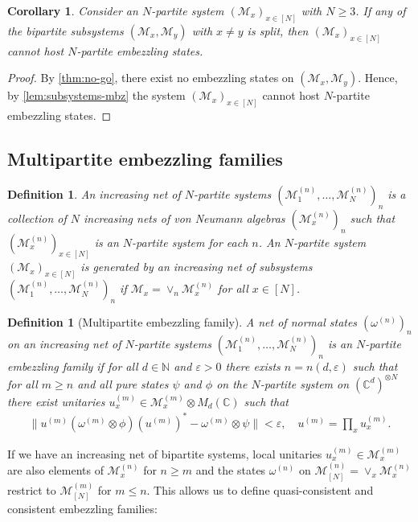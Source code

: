 \documentclass[a4paper, 10pt, onecolumn, accepted=2025-07-22]{quantumarticle}
\newtheorem{corollary}[theorem]{Corollary}
\newtheorem{definition}[theorem]{Definition}
\theoremstyle{definition}
\newcommand{\norm}[1]{\lVert #1\rVert}
\newcommand{\ox}{\otimes}
\newcommand{\mc}{\mathcal}
\newcommand{\eps}{\varepsilon}
\def\CC{{\mathbb C}}
\def\M{{\mc M}}
\def\NN{{\mathbb N}}
\newcommand*{\1}{\text{\usefont{U}{bbold}{m}{n}1}}
\begin{document}
\begin{corollary}\label{cor:nogo} Consider an $N$-partite system $(\M_x)_{x\in[N]}$ with $N\geq 3$. If any of the bipartite subsystems $(\M_x,\M_y)$ with $x\ne y$ is split, then $(\M_x)_{x\in[N]}$ cannot host $N$-partite embezzling states. 
\end{corollary}
\begin{proof}
   By \cref{thm:no-go}, there exist no embezzling states on $(\M_x,\M_y)$. Hence, by \cref{lem:subsystems-mbz} the system $(\M_x)_{x\in[N]}$ cannot host $N$-partite embezzling states.
\end{proof}


\subsection{Multipartite embezzling families}

\begin{definition}\label{def:increasing-net-Npartite}
    An \emph{increasing net of $N$-partite systems} $(\M^{(n)}_1,\ldots,\M^{(n)}_N)_n$ is a collection of $N$ increasing nets of von Neumann algebras $(\M_x^{(n)})_n$ such that $(\M^{(n)}_x)_{x\in[N]}$ is an $N$-partite system for each $n$. 
    An $N$-partite system $(\M_x)_{x\in[N]}$ is \emph{generated} by an increasing net of subsystems $(\M^{(n)}_1,\ldots,\M^{(n)}_N)_n$ if $\M_x = \vee_n \M^{(n)}_x$ for all $x\in[N]$.
\end{definition}


\begin{definition}[Multipartite embezzling family]\label{def:multipartite-mbz-family}
  A net of normal states $(\omega^{(n)})_n$ on an increasing net of $N$-partite systems $(\M_1^{(n)},\ldots,\M_N^{(n)})_n$ is an $N$-\emph{partite embezzling family} if for all $d\in\NN$ and $\eps>0$ there exists $n = n(d,\eps)$ such that for all $m\geq n$ and all pure states $\psi$ and $\phi$ on the $N$-partite system on $(\CC^d)^{\otimes N}$ there exist unitaries $u^{(m)}_x \in \M^{(m)}_x\otimes M_{d}(\CC)$ such that
  \begin{align}
      \norm{u^{(m)}(\omega^{(m)}\ox\phi)(u^{(m)})^* - \omega^{(m)} \ox \psi} < \eps,\quad u^{(m)} = \prod_x u_x^{(m)}.
  \end{align}
\end{definition}

If we have an increasing net of bipartite systems, local unitaries $u^{(m)}_x \in \M^{(m)}_x$ are also elements of $\M^{(n)}_x$ for $n\geq m$ and the states $\omega^{(n)}$ on $\M^{(n)}_{[N]} = \vee_x \M^{(n)}_x$ restrict to $\M^{(m)}_{[N]}$ for $m\leq n$.  This allows us to define quasi-consistent  and consistent embezzling families:
\end{document}
